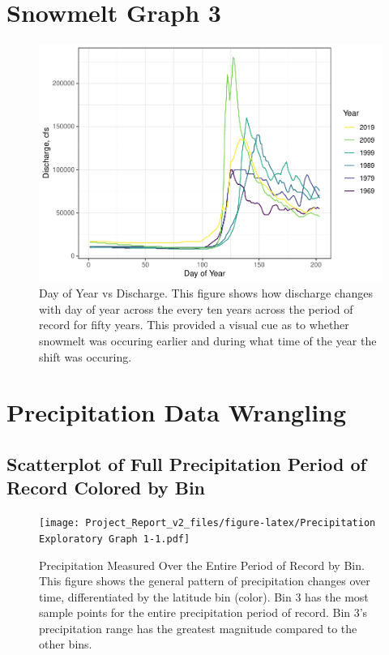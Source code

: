 \documentclass[12pt,]{article}
\begin{document}
\hypertarget{snowmelt-graph-3}{%
\section{Snowmelt Graph 3}\label{snowmelt-graph-3}}

\begin{figure}
\centering
\includegraphics{Project_Report_v2_files/figure-latex/Snowmelt Day of Year Exploratory Graph 3-1.pdf}
\caption{Day of Year vs Discharge. This figure shows how discharge
changes with day of year across the every ten years across the period of
record for fifty years. This provided a visual cue as to whether
snowmelt was occuring earlier and during what time of the year the shift
was occuring.}
\end{figure}

\hypertarget{precipitation-data-wrangling}{%
\section{Precipitation Data
Wrangling}\label{precipitation-data-wrangling}}

\hypertarget{scatterplot-of-full-precipitation-period-of-record-colored-by-bin}{%
\subsection{Scatterplot of Full Precipitation Period of Record Colored
by
Bin}\label{scatterplot-of-full-precipitation-period-of-record-colored-by-bin}}

\begin{figure}
\centering
\texttt{[image: Project\_Report\_v2\_files/figure-latex/Precipitation Exploratory Graph 1-1.pdf]}
\caption{Precipitation Measured Over the Entire Period of Record by Bin.
This figure shows the general pattern of precipitation changes over
time, differentiated by the latitude bin (color). Bin 3 has the most
sample points for the entire precipitation period of record. Bin 3's
precipitation range has the greatest magnitude compared to the other
bins.}
\end{figure}
\end{document}
